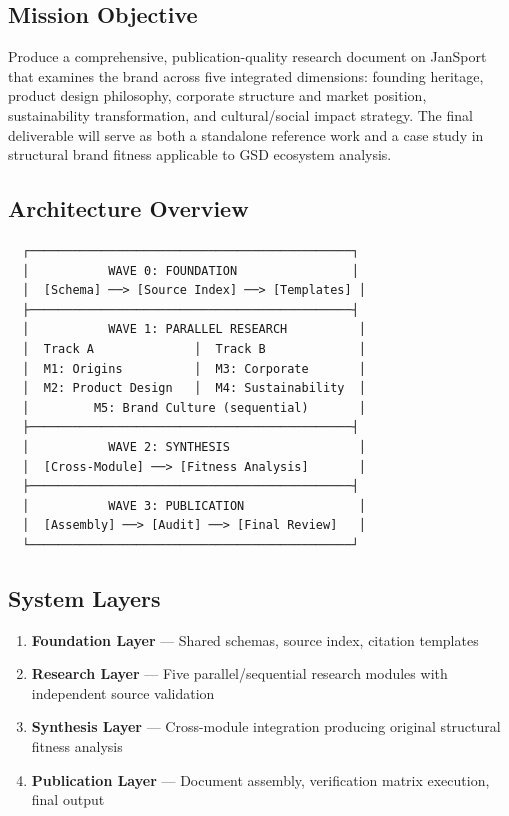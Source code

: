 \documentclass[11pt,letterpaper]{article}
\begin{document}
\subsection{Mission Objective}

Produce a comprehensive, publication-quality research document on JanSport that examines the brand across five integrated dimensions: founding heritage, product design philosophy, corporate structure and market position, sustainability transformation, and cultural/social impact strategy. The final deliverable will serve as both a standalone reference work and a case study in structural brand fitness applicable to GSD ecosystem analysis.

\subsection{Architecture Overview}

\begin{asciibox}
\begin{verbatim}
  ┌─────────────────────────────────────────────┐
  │           WAVE 0: FOUNDATION                │
  │  [Schema] ──> [Source Index] ──> [Templates] │
  ├─────────────────────────────────────────────┤
  │           WAVE 1: PARALLEL RESEARCH          │
  │  Track A              │  Track B             │
  │  M1: Origins          │  M3: Corporate       │
  │  M2: Product Design   │  M4: Sustainability  │
  │         M5: Brand Culture (sequential)       │
  ├─────────────────────────────────────────────┤
  │           WAVE 2: SYNTHESIS                  │
  │  [Cross-Module] ──> [Fitness Analysis]       │
  ├─────────────────────────────────────────────┤
  │           WAVE 3: PUBLICATION                │
  │  [Assembly] ──> [Audit] ──> [Final Review]   │
  └─────────────────────────────────────────────┘
\end{verbatim}
\end{asciibox}

\subsection{System Layers}

\begin{enumerate}[nosep]
  \item \textbf{Foundation Layer} --- Shared schemas, source index, citation templates
  \item \textbf{Research Layer} --- Five parallel/sequential research modules with independent source validation
  \item \textbf{Synthesis Layer} --- Cross-module integration producing original structural fitness analysis
  \item \textbf{Publication Layer} --- Document assembly, verification matrix execution, final output
\end{enumerate}
\end{document}

